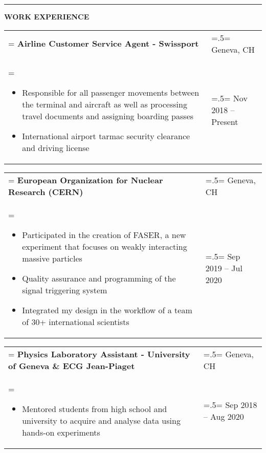 \documentclass[letterpaper, 11pt]{article}
\begin{document}
\begin{center}
\noindent\rule{0.75\textwidth}{1pt}
\end{center}

\begin{center}
\large\bf{WORK EXPERIENCE}
\end{center}

\begin{tabularx}{1.0\textwidth} { 
   >{\raggedright\arraybackslash\hsize=1.5\hsize\linewidth=\hsize}X 
   >{\raggedleft\arraybackslash\hsize=.5\hsize\linewidth=\hsize}X }
\normalsize
\bf{Airline Customer Service Agent - Swissport} & Geneva, CH\\
\normalfont \begin{itemize}[leftmargin=*,noitemsep,topsep=0pt]
\item Responsible for all passenger movements between the terminal and aircraft as well as processing travel documents and assigning boarding passes
\item International airport tarmac security clearance and driving license
\end{itemize} & Nov 2018 -- Present
\end{tabularx}

\begin{tabularx}{1.0\textwidth} { 
   >{\raggedright\arraybackslash\hsize=1.5\hsize\linewidth=\hsize}X 
   >{\raggedleft\arraybackslash\hsize=.5\hsize\linewidth=\hsize}X }
\normalsize
\bf{European Organization for Nuclear Research (CERN)} & Geneva, CH\\
\normalfont \begin{itemize}[leftmargin=*,noitemsep,topsep=0pt]
\item Participated in the creation of FASER, a new experiment that focuses on weakly interacting massive particles
\item Quality assurance and programming of the signal triggering system
\item Integrated my design in the workflow of a team of 30+ international scientists
\end{itemize} & Sep 2019 -- Jul 2020
\end{tabularx}

\begin{tabularx}{1.0\textwidth} { 
   >{\raggedright\arraybackslash\hsize=1.5\hsize\linewidth=\hsize}X 
   >{\raggedleft\arraybackslash\hsize=.5\hsize\linewidth=\hsize}X }
\normalsize
\bf{Physics Laboratory Assistant - University of Geneva \& ECG Jean-Piaget} & Geneva, CH\\
\normalfont \begin{itemize}[leftmargin=*,noitemsep,topsep=0pt]
\item Mentored students from high school and university to acquire and analyse data using hands-on experiments
\end{itemize} & Sep 2018 -- Aug 2020
\end{tabularx}
\end{document}
